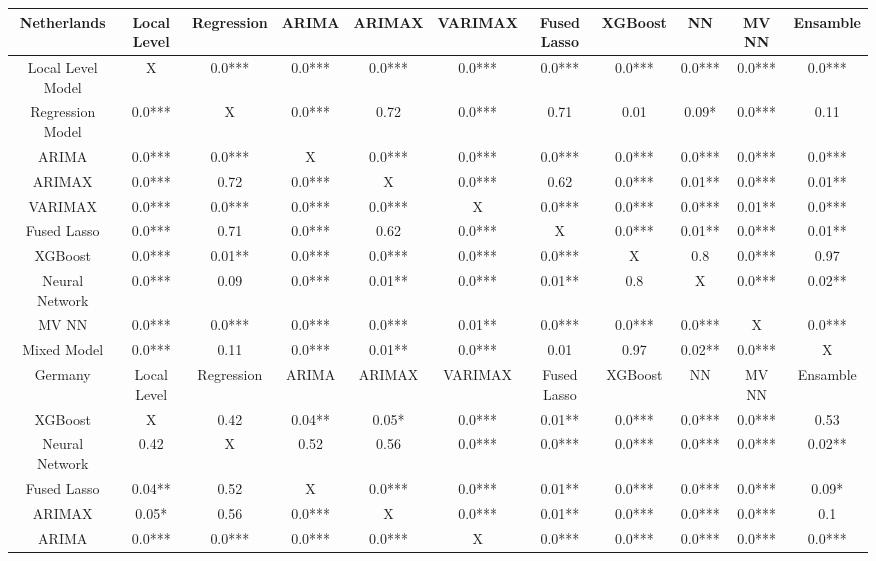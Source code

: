 \begin{landscape}
\pagestyle{empty}
\begin{table}[]
    \centering
    \begin{tabular}{|c|c c c c c c c c c c|}\hline
        Netherlands &  Local Level & Regression & ARIMA & ARIMAX & VARIMAX & Fused Lasso & XGBoost & NN & MV NN & Ensamble\\\hline
        Local Level Model & X & 0.0*** & 0.0*** & 0.0*** & 0.0*** & 0.0*** & 0.0*** & 0.0*** & 0.0*** & 0.0***\\
        Regression Model & 0.0*** & X & 0.0*** & 0.72 & 0.0*** & 0.71 & 0.01 & 0.09* & 0.0*** & 0.11\\
        ARIMA & 0.0*** & 0.0*** & X & 0.0*** & 0.0*** & 0.0*** & 0.0*** & 0.0*** & 0.0*** & 0.0***\\
        ARIMAX & 0.0*** & 0.72 & 0.0*** & X & 0.0*** & 0.62 & 0.0*** & 0.01** & 0.0*** & 0.01**\\
        VARIMAX & 0.0*** & 0.0*** & 0.0*** & 0.0*** & X & 0.0*** & 0.0*** & 0.0*** & 0.01** & 0.0***\\
        Fused Lasso & 0.0*** & 0.71 & 0.0*** & 0.62 & 0.0*** & X & 0.0*** & 0.01** & 0.0*** & 0.01**\\
        XGBoost & 0.0*** & 0.01** & 0.0*** & 0.0*** & 0.0*** & 0.0*** & X & 0.8 & 0.0*** & 0.97\\
        Neural Network & 0.0*** & 0.09 & 0.0*** & 0.01** & 0.0*** & 0.01** & 0.8 & X & 0.0*** & 0.02**\\
        MV NN & 0.0*** & 0.0*** & 0.0*** & 0.0*** & 0.01** & 0.0*** & 0.0*** & 0.0*** & X & 0.0***\\
        Mixed Model & 0.0*** & 0.11 & 0.0*** & 0.01** & 0.0*** & 0.01 & 0.97 & 0.02** & 0.0*** & X\\\hline\hline
        Germany &  Local Level & Regression & ARIMA & ARIMAX & VARIMAX & Fused Lasso & XGBoost & NN & MV NN & Ensamble\\\hline
        XGBoost & X & 0.42 & 0.04** & 0.05* & 0.0*** & 0.01** & 0.0*** & 0.0*** & 0.0*** & 0.53\\
        Neural Network & 0.42 & X & 0.52 & 0.56 & 0.0*** & 0.0*** & 0.0*** & 0.0*** & 0.0*** & 0.02**\\
        Fused Lasso & 0.04** & 0.52 & X & 0.0*** & 0.0*** & 0.01** & 0.0*** & 0.0*** & 0.0*** & 0.09*\\
        ARIMAX & 0.05* & 0.56 & 0.0*** & X & 0.0*** & 0.01** & 0.0*** & 0.0*** & 0.0*** & 0.1\\
        ARIMA & 0.0*** & 0.0*** & 0.0*** & 0.0*** & X & 0.0*** & 0.0*** & 0.0*** & 0.0*** & 0.0***\\

\end{tabular}
\end{table}
\end{landscape}
